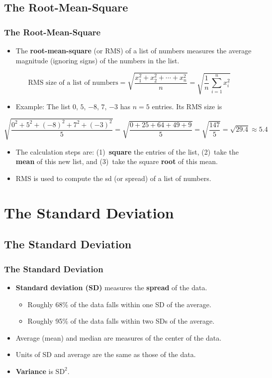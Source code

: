 \documentclass[t]{beamer}
\begin{document}
\subsection[RMS]{The Root-Mean-Square}
\begin{frame}[t]\frametitle{The Root-Mean-Square}

{\small
\begin{itemize}
\item The \textbf{root-mean-square} (or RMS) of a list of numbers measures the average magnitude (ignoring signs)
  of the numbers in the list.
\end{itemize}
\[\mbox{RMS size of a list of numbers} = \sqrt{\frac{x_1^2 + x_2^2 + \cdots + x_n^2}{n}} 
   = \sqrt{\frac{1}{n}\,\sum_{i=1}^n x_i^2}\]
\begin{itemize}
\item Example:   The list $0$, $5$, $-8$, $7$, $-3$ has $n=5$ entries.  Its RMS size is
\end{itemize}
{\footnotesize\[\sqrt{\frac{0^2+5^2+(-8)^2 + 7^2 + (-3)^2}{5}}=\sqrt{\frac{0+25+64+49+9}{5}}
   =\sqrt{\frac{147}{5}}=\sqrt{29.4}\approx 5.4\]}
\begin{itemize}
\item The calculation steps are:  (1)~{\color{blue}\textbf{square}} the entries of the list, 
  (2)~take the {\color{blue}\textbf{mean}} of this new list, and (3)~take
  the square {\color{blue}\textbf{root}} of this mean.
\item RMS is used to compute the sd (or spread) of a list of numbers.
\end{itemize}
}

\end{frame}


\section[SD]{The Standard Deviation}
\subsection[SD]{The Standard Deviation}
\begin{frame}[t]\frametitle{The Standard Deviation}
{\small
\begin{itemize}
\item \textbf{Standard deviation (SD)} measures the \textbf{spread} of the data.
   \begin{itemize}
   \item Roughly 68\% of the data falls within one SD of the average.
   \item Roughly 95\% of the data falls within two SDs of the average.
   \end{itemize}
\item Average (mean) and median are measures of the center of the data.
\item Units of SD and average are the same as those of the data.
\item \textbf{Variance} is $\mbox{SD}^2$.
\end{itemize}


}
\end{frame}
\end{document}
